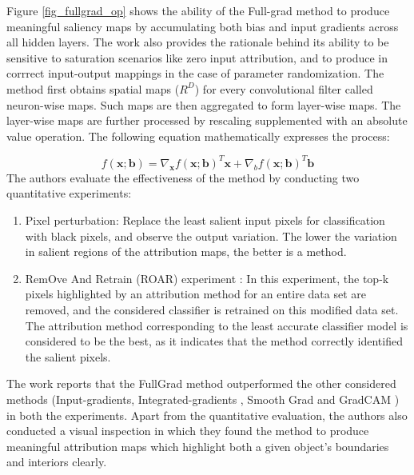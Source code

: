 \documentclass[../report.tex]{subfiles}
\begin{document}
Figure \ref{fig_fullgrad_op} shows the ability of the Full-grad method to produce meaningful saliency maps by accumulating both bias and input gradients across all hidden layers. The work also provides the rationale behind its ability to be sensitive to saturation scenarios like zero input attribution, and to produce in corrrect input-output mappings in the case of parameter randomization. The method first obtains spatial maps ($R^D$)  for every convolutional filter called neuron-wise maps. Such maps are then aggregated to form layer-wise maps. The layer-wise maps are further processed by rescaling supplemented with an absolute value operation. The following equation mathematically expresses the process: 

\begin{equation*}
	f(\mathbf{x} ; \mathbf{b})=\nabla_{\mathbf{x}} f(\mathbf{x} ; \mathbf{b})^T \mathbf{x}+\nabla_b f(\mathbf{x} ; \mathbf{b})^T \mathbf{b}
\end{equation*}
The authors evaluate the effectiveness of the method by conducting two quantitative experiments:
\begin{enumerate}
	\item Pixel perturbation: Replace the least salient input pixels for classification with black pixels, and observe the output variation. The lower the variation in salient regions of the attribution maps, the better is a method.
	\item  RemOve And Retrain (ROAR) experiment \cite{hooker2018evaluating}: In this experiment, the top-k pixels highlighted by an attribution method for an entire data set are removed, and the considered classifier is retrained on this modified data set. The attribution method corresponding to the least accurate classifier model is considered to be the best, as it indicates that the method correctly identified the salient pixels.
\end{enumerate}
The work reports that the FullGrad method outperformed the other considered methods (Input-gradients\cite{shrikumar2017learning}, Integrated-gradients \cite{sundararajan2017axiomatic}, Smooth Grad \cite{smilkov2017smoothgrad} and GradCAM \cite{selvaraju2017grad}) in both the experiments. Apart from the quantitative evaluation, the authors also conducted a visual inspection in which they found the method to produce meaningful attribution maps which highlight both a given object’s boundaries and interiors clearly.
\end{document}
